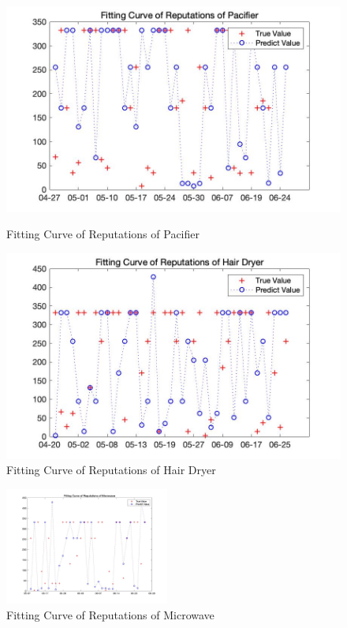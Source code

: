 \documentclass{mcmthesis}
\begin{document}
\begin{figure}[H]
\begin{minipage}[t]{0.48\linewidth}	
\centering
\includegraphics[width=1.0\textwidth]{figures/curve_pacifier.jpg}
\caption{Fitting Curve of Reputations of Pacifier}	  
\label{curve_pacifier}
\end{minipage}
\hfill
\begin{minipage}[t]{0.48\linewidth}	
\centering
\includegraphics[width=1.0\textwidth]{figures/curve_hair.jpg}
\caption{Fitting Curve of Reputations of Hair Dryer}	  
\end{minipage}
\end{figure}
\begin{figure}[H]
\centering
\includegraphics[width=0.48\textwidth]{figures/curve_wave.jpg}
\caption{Fitting Curve of Reputations of Microwave}	  
\end{figure}
\end{document}

